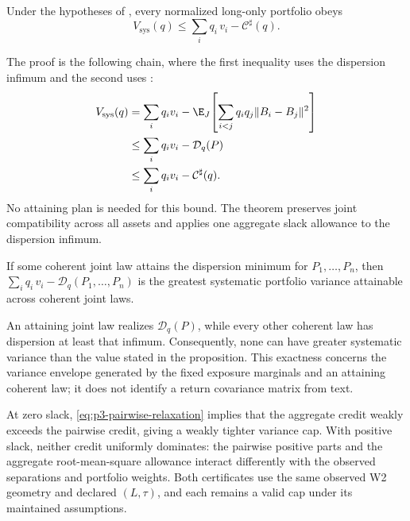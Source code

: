 \begin{theorem}
  \label{thm:p3-sharp-certificate}
  Under the hypotheses of , every
  normalized long-only portfolio obeys
  \begin{equation}\label{eq:p3-sharp-cap}
    V_{\mathrm{sys}}(q)\le\sum_i q_i\,v_i-\mathcal C^{\sharp}(q).
  \end{equation}
\end{theorem}

The proof is the following chain, where the first inequality uses the
dispersion infimum and the second uses
:
\[
  \begin{aligned}
    V_{\mathrm{sys}}(q)
    &=\sum_i q_i v_i-
    \E_J\!\left[\sum_{i<j} q_i q_j\lVert B_i-B_j\rVert^2\right]\\
    &\le\sum_i q_i v_i-\mathcal D_q(P)\\
    &\le\sum_i q_i v_i-\mathcal C^{\sharp}(q).
  \end{aligned}
\]
No attaining plan is needed for this bound.
The theorem preserves joint compatibility across all assets and applies one
aggregate slack allowance to the dispersion infimum.

\begin{proposition}\label{thm:p3-envelope-exactness}
  If some coherent joint law attains the dispersion minimum for
  $P_1,\dots,P_n$, then $\sum_i q_i\,v_i-\mathcal D_q(P_1,\dots,P_n)$ is the
  greatest systematic portfolio variance attainable across coherent joint laws.
\end{proposition}
An attaining joint law realizes $\mathcal D_q(P)$, while every other coherent
law has dispersion at least that infimum.
Consequently, none can have greater systematic variance than the value stated
in the proposition.
This exactness concerns the variance envelope generated by the fixed exposure
marginals and an attaining coherent law; it does not identify a return
covariance matrix from text.

At zero slack, \eqref{eq:p3-pairwise-relaxation} implies that the aggregate
credit weakly exceeds the pairwise credit, giving a weakly tighter variance cap.
With positive slack, neither credit uniformly dominates: the pairwise positive
parts and the aggregate root-mean-square allowance interact differently with
the observed separations and portfolio weights.
Both certificates use the same observed W2 geometry and declared $(L,\tau)$,
and each remains a valid cap under its maintained assumptions.

